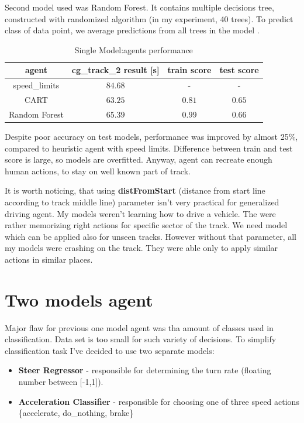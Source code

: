\documentclass[declaration,shortabstract,english,inz]{iithesis}
\begin{document}
Second model used was Random Forest. It contains multiple decisions tree, constructed with randomized algorithm (in my experiment, 40 trees). To predict class of data point, we average predictions from all trees in the model \cite{Introduction_ML}. 

\begin{table}[h]
    \centering
    \begin{tabular}{ |c|c|c|c|}
          \hline
          agent & cg\_track\_2 result [s] & train score & test score \\
          \hline
          speed\_limits & $84.68$ & - & -\\
          \hline
          CART &  $63.25$ & $0.81$ & $0.65$\\
          \hline
          Random Forest & $65.39$ & $0.99$ & $0.66$ \\
          \hline
          
        \end{tabular}
        \caption{Single Model:agents performance}
        \label{tab:single_clp_tree}

\end{table}


Despite poor accuracy on test models, performance was improved by almost 25\%, compared to heuristic agent with speed limits. Difference between train and test score is large, so models are overfitted. Anyway, agent can recreate enough human actions, to stay on well known part of track. 

It is worth noticing, that using \textbf{distFromStart} (distance from start line according to track middle line) parameter isn't very practical for generalized driving agent. My models weren't learning how to drive a vehicle. The were rather memorizing right actions for specific sector of the track. We need model which can be applied also for unseen tracks. However without that parameter, all my models were crashing on the track. They were able only to apply similar actions in similar places.

\section{Two models agent}

Major flaw for previous one model agent was tha amount of classes used in classification. Data set is too small for such variety of decisions. To simplify classification task I've decided to use two separate models: 

\begin{itemize}
    \item \textbf{Steer Regressor} - responsible for determining the turn rate (floating number between [-1,1]).
    \item \textbf{Acceleration Classifier} - responsible for choosing one of three speed actions \{accelerate, do\_nothing, brake\}
\end{itemize}
\end{document}

